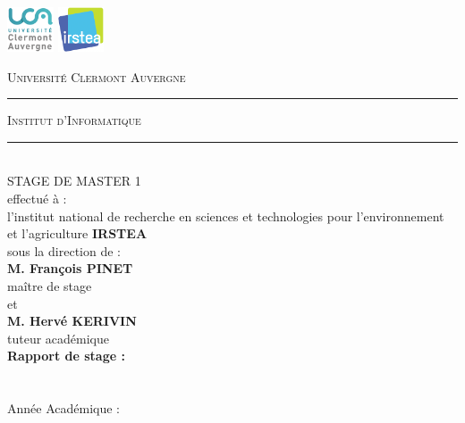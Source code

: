 \newenvironment{changemargin}[2]{\begin{list}{}{%
\setlength{\topsep}{0pt}%
\setlength{\leftmargin}{0pt}%
\setlength{\rightmargin}{0pt}%
\setlength{\listparindent}{\parindent}%
\setlength{\itemindent}{\parindent}%
\setlength{\parsep}{0pt plus 1pt}%
\addtolength{\leftmargin}{#1}%
\addtolength{\rightmargin}{#2}%
}\item }{\end{list}}
\begin{changemargin}{-2cm}{-2cm}
\newcommand{\HRule}{\rule[2mm]{10mm}{0.5mm}}
\thispagestyle{empty}
\includegraphics[height=50px]{images/Logo-UCA.png}
\hspace*{\fill}
\includegraphics[height=50px]{images/irstea_logo.png}
\begin{center}
    \textsc{\large Université Clermont Auvergne}\\[0.5mm]
    \HRule \textsc{ Institut d'Informatique} \HRule 
    \\[1cm]
    STAGE DE MASTER 1
    \\[1cm]
     effectué à : 
     \\
   l'institut national de recherche en sciences et technologies pour l'environnement et l'agriculture
   \textbf{IRSTEA}
   \\[0.5cm]
    sous la direction de : 
    \\[1cm]
    \textbf{M. François PINET}
    \\
    maître de stage
    \\[0.5cm]
    et
    \\[0.5cm]
  \textbf{M. Hervé KERIVIN}
    \\
    tuteur académique
    \\[2cm]
    
    \textbf{\large{Rapport de stage : }}
    \\[.5cm]
    {\huge \Title}
    \\[2cm]

    \textbf{\Author}
    \\[0.5cm]

    Année Académique : \Date
\end{center}
\end{changemargin}

